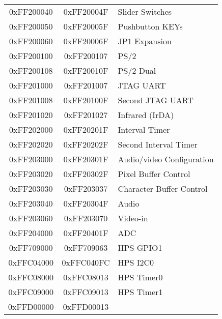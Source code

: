 \begin{table}[h]
\begin{center}
\begin{tabular}{c|c|l}
        \\
            0xFF200040
            & 0xFF20004F
            & Slider Switches
        \\
            0xFF200050
            & 0xFF20005F
            & Pushbutton KEYs
        \\
            0xFF200060
            & 0xFF20006F
            & JP1 Expansion
        \\
            0xFF200100
            & 0xFF200107
            & PS/2
        \\
            0xFF200108
            & 0xFF20010F
            & PS/2 Dual
        \\
            0xFF201000
            & 0xFF201007
            & JTAG UART
        \\
            0xFF201008
            & 0xFF20100F
            & Second JTAG UART
        \\
            0xFF201020
            & 0xFF201027
				& Infrared (IrDA)
        \\
            0xFF202000
            & 0xFF20201F
            & Interval Timer
        \\
            0xFF202020
            & 0xFF20202F
            & Second Interval Timer
        \\
            0xFF203000
            & 0xFF20301F
            & Audio/video Configuration
        \\
            0xFF203020
            & 0xFF20302F
            & Pixel Buffer Control
        \\
            0xFF203030
            & 0xFF203037
            & Character Buffer Control
        \\
            0xFF203040
            & 0xFF20304F
            & Audio
        \\
            0xFF203060
            & 0xFF203070
            & Video-in
        \\
            0xFF204000
            & 0xFF20401F
            & ADC
        \\
            0xFF709000
            & 0xFF709063
            & HPS GPIO1
        \\
            0xFFC04000
            & 0xFFC040FC
            & HPS I2C0
        \\
            0xFFC08000
            & 0xFFC08013
            & HPS Timer0
        \\
            0xFFC09000
            & 0xFFC09013
            & HPS Timer1
        \\
            0xFFD00000
            & 0xFFD00013

\end{tabular}
\end{center}
\end{table}
